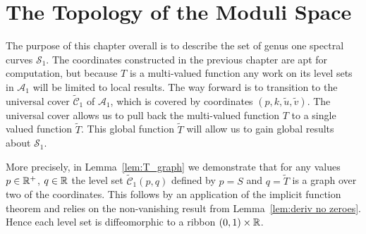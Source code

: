























\section{The Topology of the Moduli Space}
\label{sec:Topology}

The purpose of this chapter overall is to describe the set of genus one spectral curves $\mathcal{S}_1$. The coordinates constructed in the previous chapter are apt for computation, but because $T$ is a multi-valued function any work on its level sets in $\mathcal{A}_1$ will be limited to local results. The way forward is to transition to the universal cover $\mathcal{\tilde{C}}_1$ of $\mathcal{A}_1$, which is covered by coordinates $(p,k,\tilde{u},\tilde{v})$. The universal cover allows us to pull back the multi-valued function $T$ to a single valued function $\tilde{T}$. This global function $\tilde{T}$ will allow us to gain global results about $\mathcal{S}_1$.

More precisely,
in Lemma~\ref{lem:T_graph} we demonstrate that for any values $p \in \R^+$, $q\in\R$ the level set $\mathcal{\tilde{C}}_1(p,q)$ defined by $p = S$ and $q = \tilde{T}$ is a graph over two of the coordinates. This follows by an application of the implicit function theorem and relies on the non-vanishing result from Lemma~\ref{lem:deriv no zeroes}. Hence each level set is diffeomorphic to a ribbon $(0,1)\times\R$.

